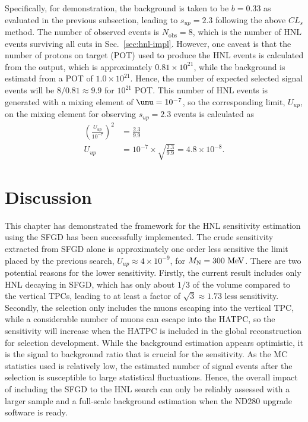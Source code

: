         Specifically, for demonstration, the background is taken to be $b=0.33$ as evaluated in the previous subsection, leading to $s_{up}=2.3$ following the above $CL_s$ method.
        The number of observed events is $N_{\textrm{obs}}=8$, which is the number of HNL events surviving all cuts in Sec.~\ref{sec:hnl-impl}.
        However, one caveat is that the number of protons on target (POT) used to produce the HNL events is calculated from the  output, which is approximately $0.81\times10^{21}$, while the background is estimatd from a POT of $1.0\times10^{21}$.
        Hence, the number of expected selected signal events will be $8/0.81\approx9.9$ for $10^{21}$ POT.
        This number of HNL events is generated with a mixing element of $\umu = 10^{-7}$, so the corresponding limit, $U_{up}$, on the mixing element for observing $s_{up}=2.3$ events is calculated as 
        \begin{align}
            \left(\frac{U_{up}}{10^{-7}}\right)^2 & =  \frac{2.3}{9.9} \\
            U_{up} & = 10^{-7} \times \sqrt{\frac{2.3}{9.9}} = 4.8\times10^{-8}.
        \end{align}

    \section{Discussion}
        This chapter has demonstrated the framework for the HNL sensitivity estimation using the SFGD has been successfully implemented.
        The crude sensitivity extracted from SFGD alone is approximately one order less sensitive the limit placed by the previous search, $U_{up}\approx4\times10^{-9}$, for $M_{\textrm{N}}=300~\textrm{MeV}$.
        There are two potential reasons for the lower sensitivity.
        Firstly, the current result includes only HNL decaying in SFGD, which has only about $1/3$ of the volume compared to the vertical TPCs, leading to at least a factor of $\sqrt{3}\approx1.73$ less sensitivity.
        Secondly, the selection only includes the muons escaping into the vertical TPC, while a considerable number of muons can escape into the HATPC, so the sensitivity will increase when the HATPC is included in the global reconstruction for selection development.
        While the background estimation appears optimistic, it is the signal to background ratio that is crucial for the sensitivity.
        As the MC statistics used is relatively low, the estimated number of signal events after the selection is susceptible to large statistical fluctuations. 
        Hence, the overall impact of including the SFGD to the HNL search can only be reliably assessed 
        with a larger sample and a full-scale background estimation when the ND280 upgrade software is ready.
        
